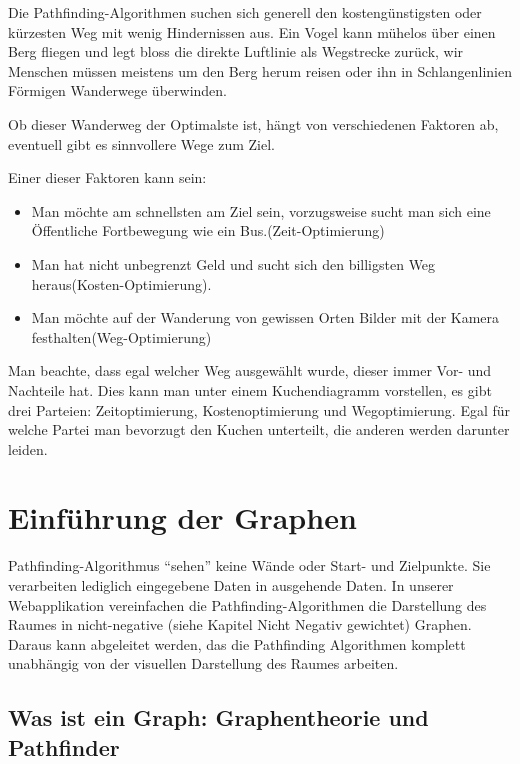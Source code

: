 Die Pathfinding-Algorithmen suchen sich generell den kostengünstigsten
oder kürzesten Weg mit wenig Hindernissen aus. Ein Vogel kann mühelos
über einen Berg fliegen und legt bloss die direkte Luftlinie als
Wegstrecke zurück, wir Menschen müssen meistens um den Berg herum reisen
oder ihn in Schlangenlinien Förmigen Wanderwege überwinden.

Ob dieser Wanderweg der Optimalste ist, hängt von verschiedenen Faktoren
ab, eventuell gibt es sinnvollere Wege zum Ziel.

Einer dieser Faktoren kann sein:

\begin{itemize}
\item
  Man möchte am schnellsten am Ziel sein, vorzugsweise sucht man sich
  eine Öffentliche Fortbewegung wie ein Bus.(Zeit-Optimierung)
\item
  Man hat nicht unbegrenzt Geld und sucht sich den billigsten Weg
  heraus(Kosten-Optimierung).
\item
  Man möchte auf der Wanderung von gewissen Orten Bilder mit der Kamera
  festhalten(Weg-Optimierung)
\end{itemize}

Man beachte, dass egal welcher Weg ausgewählt wurde, dieser immer Vor-
und Nachteile hat. Dies kann man unter einem Kuchendiagramm vorstellen,
es gibt drei Parteien: Zeitoptimierung, Kostenoptimierung und
Wegoptimierung. Egal für welche Partei man bevorzugt den Kuchen
unterteilt, die anderen werden darunter leiden.
\cite[Wikipedia, 2018]{wikipath}

\section{Einführung der Graphen}

Pathfinding-Algorithmus ``sehen'' keine Wände oder Start- und
Zielpunkte. Sie verarbeiten lediglich eingegebene Daten in ausgehende
Daten. In unserer Webapplikation vereinfachen die
Pathfinding-Algorithmen die Darstellung des Raumes in nicht-negative
(siehe Kapitel Nicht Negativ gewichtet) Graphen. Daraus kann abgeleitet
werden, das die Pathfinding Algorithmen komplett unabhängig von der
visuellen Darstellung des Raumes arbeiten.
\cite[Andreas Hofmann, 2013]{pfbsc}

\subsection{Was ist ein Graph: Graphentheorie und Pathfinder}

